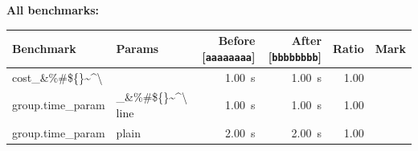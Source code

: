 
\noindent
\textbf{All benchmarks:}

\begin{tabular}{llrrrc}
\toprule
Benchmark & Params & Before [\texttt{aaaaaaaa}] & After [\texttt{bbbbbbbb}] & Ratio & Mark \\
\midrule
cost\_\&\%\#\$\{\}\textasciitilde{}\textasciicircum{}\textbackslash{} &  & \qty{1.00}{\second} & \qty{1.00}{\second} & \num{1.00} &  \\
group.time\_param & \_\&\%\#\$\{\}\textasciitilde{}\textasciicircum{}\textbackslash{} line & \qty{1.00}{\second} & \qty{1.00}{\second} & \num{1.00} &  \\
group.time\_param & plain & \qty{2.00}{\second} & \qty{2.00}{\second} & \num{1.00} &  \\
\bottomrule
\end{tabular}
